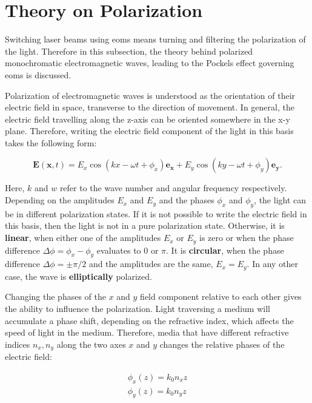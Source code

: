 \section{Theory on Polarization}%
\label{sec:pol}

Switching laser beams using \acp{eom} means turning and filtering the polarization of the light. Therefore in this subsection, the theory behind polarized monochromatic electromagnetic waves, leading to the Pockels effect governing \acp{eom} is discussed.

Polarization of electromagnetic waves is understood as the orientation of their electric field in space, transverse to the direction of movement. In general, the electric field travelling along the z-axis can be oriented somewhere in the x-y plane. Therefore, writing the electric field component of the light in this basis takes the following form:

\begin{equation}
	\mathbf{E}(\mathbf{x}, t) = E_x \cos\left(kx - \omega t + \phi_x\right) \mathbf{e_x} + E_y \cos\left(ky - \omega t + \phi_y\right) \mathbf{e_y}.
\end{equation}

Here, $k$ and $w$ refer to the wave number and angular frequency respectively.
Depending on the amplitudes $E_x$ and $E_y$ and the phases $\phi_x$ and $\phi_y$, the light can be in different polarization states. If it is not possible to write the electric field in this basis, then the light is not in a pure polarization state. Otherwise, it is \textbf{linear}, when either one of the amplitudes $E_x$ or $E_y$ is zero or when the phase difference $\Delta \phi = \phi_x - \phi_y$ evaluates to 0 or $\pi$. It is \textbf{circular}, when the phase difference $\Delta \phi = \pm \pi/2$ and the amplitudes are the same, $E_x = E_y$. In any other case, the wave is \textbf{elliptically} polarized.

Changing the phases of the $x$ and $y$ field component relative to each other gives the ability to influence the polarization. Light traversing a medium will accumulate a phase shift, depending on the refractive index, which affects the speed of light in the medium. Therefore, media that have different refractive indices $n_x, n_y$ along the two axes $x$ and $y$ changes the relative phases of the electric field:

\begin{align}
	\label{eq:pol,phases1}
	\phi_x(z) = k_0 n_x z \\
	\label{eq:pol,phases2}
	\phi_y(z) = k_0 n_y z
\end{align}

